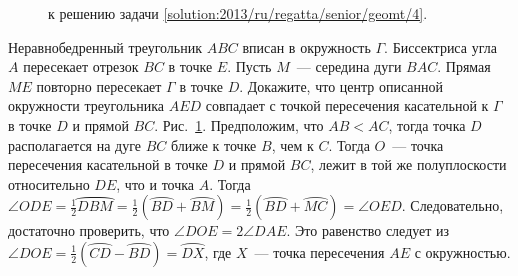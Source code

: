 \ifsolution
\begin{figure}\centering
    \caption{к решению задачи \ref{solution:2013/ru/regatta/senior/geomt/4}.}
    \label{fig:solution:2013/ru/regatta/senior/geomt/4}
\end{figure}%
\fi %


\problem
Неравнобедренный треугольник $ABC$ вписан в окружность $\Gamma$.
Биссектриса угла $A$ пересекает отрезок $BC$ в точке $E$.
Пусть $M$~--- середина дуги $BAC$.
Прямая $ME$ повторно пересекает $\Gamma$ в точке $D$.
Докажите, что центр описанной окружности треугольника $AED$ совпадает с точкой
пересечения касательной к $\Gamma$ в точке $D$ и прямой $BC$.
\solution
\label{solution:2013/ru/regatta/senior/geomt/4}%
Рис.~\ref{fig:solution:2013/ru/regatta/senior/geomt/4}.
Предположим, что $AB < AC$, тогда точка $D$ располагается на дуге $BC$ ближе к
точке $B$, чем к $C$.
Тогда $O$~--- точка пересечения касательной в точке $D$ и прямой $BC$, лежит в
той же полуплоскости относительно $DE$, что и точка $A$.
Тогда
\(
    \angle ODE
=
    \frac{1}{2} \wideparen{DBM}
=
    \frac{1}{2}(\wideparen{BD} + \wideparen{BM})
=
    \frac{1}{2} (\wideparen{BD} + \wideparen{MC})
=
    \angle OED
\).
Следовательно, достаточно проверить, что $\angle DOE = 2\angle DAE$.
Это равенство следует из
$\angle DOE = \frac{1}{2} (\wideparen{CD}-\wideparen{BD}) = \wideparen{DX}$,
где $X$~--- точка пересечения $AE$ с окружностью.
\endproblem
